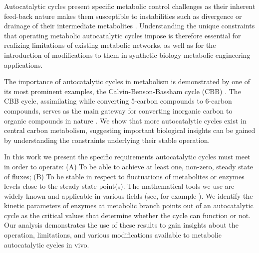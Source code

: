 \documentclass[a4page,notitlepage]{article}
\begin{document}
    Autocatalytic cycles present specific metabolic control challenges as their inherent feed-back nature makes them susceptible to instabilities such as divergence or drainage of their intermediate metabolites \cite{Fell1999,Reznik2010-te}.
    Understanding the unique constraints that operating metabolic autocatalytic cycles impose is therefore essential for realizing limitations of existing metabolic networks, as well as for the introduction of modifications to them in synthetic biology metabolic engineering applications.

    The importance of autocatalytic cycles in metabolism is demonstrated by one of its most prominent examples, the Calvin-Benson-Bassham cycle (CBB) \cite{Benson1950-cl}.
    The CBB cycle, assimilating  while converting 5-carbon compounds to 6-carbon compounds, serves as the main gateway for converting inorganic carbon to organic compounds in nature \cite{Raven2012-le}.
    We show that more autocatalytic cycles exist in central carbon metabolism, suggesting important biological insights can be gained by understanding the constraints underlying their stable operation.

    In this work we present the specific requirements autocatalytic cycles must meet in order to operate: (A) To be able to achieve at least one, non-zero, steady state of fluxes; 
    (B) To be stable in respect to fluctuations of metabolites or enzymes levels close to the steady state point(s).
    The mathematical tools we use are widely known and applicable in various fields (see, for example \cite{Strogatz2014-hp}).
    We identify the kinetic parameters of enzymes at metabolic branch points out of an autocatalytic cycle as the critical values that determine whether the cycle can function or not.
    Our analysis demonstrates the use of these results to gain insights about the operation, limitations, and various modifications available to metabolic autocatalytic cycles in vivo.
\end{document}
